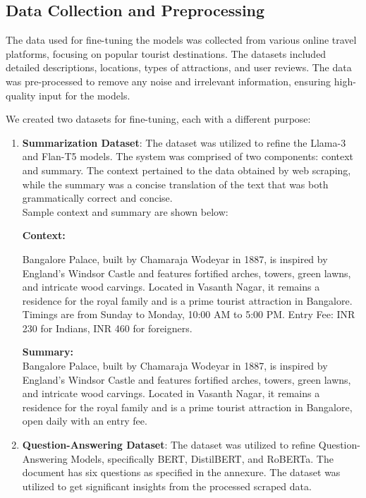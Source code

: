 \documentclass[conference]{IEEEtran}
\begin{document}
    \subsection{Data Collection and Preprocessing}

        The data used for fine-tuning the models was collected from various online travel platforms, focusing on popular tourist destinations. The datasets included detailed descriptions, locations, types of attractions, and user reviews. The data was pre-processed to remove any noise and irrelevant information, ensuring high-quality input for the models.

        We created two datasets for fine-tuning, each with a different purpose:

        \begin{enumerate}
            \item \textbf{Summarization Dataset}: The dataset was utilized to refine the Llama-3 and Flan-T5 models. The system was comprised of two components: context and summary. The context pertained to the data obtained by web scraping, while the summary was a concise translation of the text that was both grammatically correct and concise.\\

            Sample context and summary are shown below:

            \begin{tcolorbox}[linewidth=1pt, innerleftmargin=15pt, innerrightmargin=15pt, innertopmargin=15pt, innerbottommargin=15pt]
                \textbf{Context:}

                Bangalore Palace, built by Chamaraja Wodeyar in 1887, is inspired by England's Windsor Castle and features fortified arches, towers, green lawns, and intricate wood carvings. Located in Vasanth Nagar, it remains a residence for the royal family and is a prime tourist attraction in Bangalore. Timings are from Sunday to Monday, 10:00 AM to 5:00 PM. Entry Fee: INR 230 for Indians, INR 460 for foreigners.
                {\\}

                \textbf{Summary:} \\
                Bangalore Palace, built by Chamaraja Wodeyar in 1887, is inspired by England's Windsor Castle and features fortified arches, towers, green lawns, and intricate wood carvings. Located in Vasanth Nagar, it remains a residence for the royal family and is a prime tourist attraction in Bangalore, open daily with an entry fee.
            \end{tcolorbox}

            \item \textbf{Question-Answering Dataset}: The dataset was utilized to refine Question-Answering Models, specifically BERT, DistilBERT, and RoBERTa. The document has six questions as specified in the annexure. The dataset was utilized to get significant insights from the processed scraped data.
        \end{enumerate}
\end{document}
